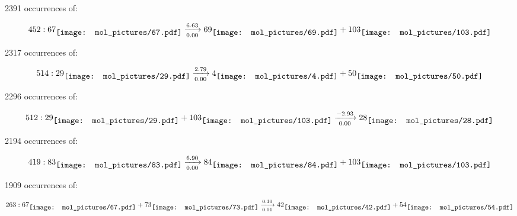 \documentclass{article}
\begin{document}
\vspace{1cm}


2391 occurrences of:

$$
452:  
67
\raisebox{-.5\height}{\texttt{[image: mol\_pictures/67.pdf]}}
\xrightarrow[0.00]{6.63}
69
\raisebox{-.5\height}{\texttt{[image: mol\_pictures/69.pdf]}}
+
103
\raisebox{-.5\height}{\texttt{[image: mol\_pictures/103.pdf]}}
$$



\vspace{1cm}


2317 occurrences of:

$$
514:  
29
\raisebox{-.5\height}{\texttt{[image: mol\_pictures/29.pdf]}}
\xrightarrow[0.00]{2.79}
4
\raisebox{-.5\height}{\texttt{[image: mol\_pictures/4.pdf]}}
+
50
\raisebox{-.5\height}{\texttt{[image: mol\_pictures/50.pdf]}}
$$



\vspace{1cm}


2296 occurrences of:

$$
512:  
29
\raisebox{-.5\height}{\texttt{[image: mol\_pictures/29.pdf]}}
+
103
\raisebox{-.5\height}{\texttt{[image: mol\_pictures/103.pdf]}}
\xrightarrow[0.00]{-2.93}
28
\raisebox{-.5\height}{\texttt{[image: mol\_pictures/28.pdf]}}
$$



\vspace{1cm}


2194 occurrences of:

$$
419:  
83
\raisebox{-.5\height}{\texttt{[image: mol\_pictures/83.pdf]}}
\xrightarrow[0.00]{6.90}
84
\raisebox{-.5\height}{\texttt{[image: mol\_pictures/84.pdf]}}
+
103
\raisebox{-.5\height}{\texttt{[image: mol\_pictures/103.pdf]}}
$$



\vspace{1cm}


1909 occurrences of:

$$
263:  
67
\raisebox{-.5\height}{\texttt{[image: mol\_pictures/67.pdf]}}
+
73
\raisebox{-.5\height}{\texttt{[image: mol\_pictures/73.pdf]}}
\xrightarrow[0.01]{0.10}
42
\raisebox{-.5\height}{\texttt{[image: mol\_pictures/42.pdf]}}
+
54
\raisebox{-.5\height}{\texttt{[image: mol\_pictures/54.pdf]}}
$$
\end{document}
